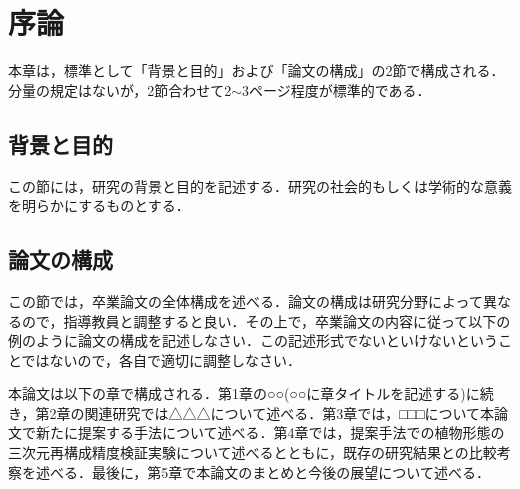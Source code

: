 \chapter{序論}
本章は，標準として「背景と目的」および「論文の構成」の2節で構成される．分量の規定はないが，2節合わせて2$\sim $3ページ程度が標準的である．

\section{背景と目的}
この節には，研究の背景と目的を記述する．研究の社会的もしくは学術的な意義を明らかにするものとする．

\section{論文の構成}
この節では，卒業論文の全体構成を述べる．論文の構成は研究分野によって異なるので，指導教員と調整すると良い．その上で，卒業論文の内容に従って以下の例のように論文の構成を記述しなさい．この記述形式でないといけないということではないので，各自で適切に調整しなさい．

本論文は以下の章で構成される．第1章の○○(○○に章タイトルを記述する)に続き，第2章の関連研究では△△△について述べる．第3章では，□□□について本論文で新たに提案する手法について述べる．第4章では，提案手法での植物形態の三次元再構成精度検証実験について述べるとともに，既存の研究結果との比較考察を述べる．最後に，第5章で本論文のまとめと今後の展望について述べる．
